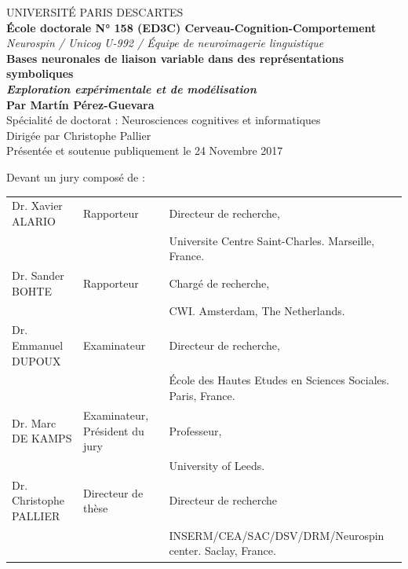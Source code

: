 \documentclass[twoside, justified, notoc, nobib, 
	nohyper]{tufte-book}
\begin{document}
\begin{titlepage}
\begin{fullwidth}
\begin{center}
\vspace*{1.00cm}
UNIVERSITÉ PARIS DESCARTES \\
\vspace*{0.25cm}
\textbf{École doctorale N° 158 (ED3C) Cerveau-Cognition-Comportement}\\
\vspace*{0,25cm}
\textit{Neurospin / Unicog U-992 / Équipe de neuroimagerie linguistique}\\
\vspace*{2cm}
\LARGE{\textbf{Bases neuronales de liaison variable dans des représentations symboliques}}\\
\vspace*{0,5cm}
\large{\textit{\textbf{Exploration expérimentale et de modélisation}}}\\
\vspace*{0.5cm}
\large{\textbf{Par Mart\'in P\'erez-Guevara}}\\
\vspace*{0.5cm}
Spécialité de doctorat : Neurosciences cognitives et informatiques\\
\vspace*{0.5cm}
Dirigée par Christophe Pallier\\
\vspace*{0.5cm}
\small{Présentée et soutenue publiquement le 24 Novembre 2017}\\
\end{center}

\vspace*{1cm}
\begin{footnotesize}
Devant un jury composé de : \\[0.25cm]
\begin{tabular}{lll}
Dr. Xavier ALARIO & Rapporteur & Directeur de recherche,\\ & & Universite Centre Saint-Charles. Marseille, France.\\
Dr. Sander BOHTE & Rapporteur & Chargé de recherche,\\ & &  CWI. Amsterdam, The Netherlands.\\
Dr. Emmanuel DUPOUX & Examinateur & Directeur de recherche,\\ & &  École des Hautes Etudes en Sciences Sociales. Paris, France.\\
Dr. Marc DE KAMPS & Examinateur, Président du jury & Professeur,\\ & & University of Leeds.\\
Dr. Christophe PALLIER & Directeur de thèse & Directeur de recherche\\& & INSERM/CEA/SAC/DSV/DRM/Neurospin center. Saclay, France.\\
\end{tabular}
\end{footnotesize}


\end{fullwidth}
\end{titlepage}
\end{document}
